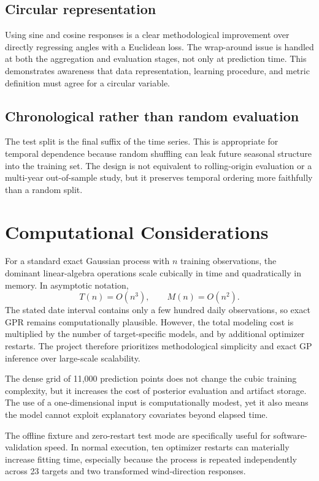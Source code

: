 \documentclass[11pt,a4paper]{article}
\begin{document}
\subsection{Circular representation}
Using sine and cosine responses is a clear methodological improvement over directly regressing angles with a Euclidean loss. The wrap-around issue is handled at both the aggregation and evaluation stages, not only at prediction time. This demonstrates awareness that data representation, learning procedure, and metric definition must agree for a circular variable.

\subsection{Chronological rather than random evaluation}
The test split is the final suffix of the time series. This is appropriate for temporal dependence because random shuffling can leak future seasonal structure into the training set. The design is not equivalent to rolling-origin evaluation or a multi-year out-of-sample study, but it preserves temporal ordering more faithfully than a random split.

\section{Computational Considerations}
For a standard exact Gaussian process with $n$ training observations, the dominant linear-algebra operations scale cubically in time and quadratically in memory. In asymptotic notation,
\begin{equation}
 T(n)=O(n^3),\qquad M(n)=O(n^2).
\end{equation}
The stated date interval contains only a few hundred daily observations, so exact GPR remains computationally plausible. However, the total modeling cost is multiplied by the number of target-specific models, and by additional optimizer restarts. The project therefore prioritizes methodological simplicity and exact GP inference over large-scale scalability.

The dense grid of 11,000 prediction points does not change the cubic training complexity, but it increases the cost of posterior evaluation and artifact storage. The use of a one-dimensional input is computationally modest, yet it also means the model cannot exploit explanatory covariates beyond elapsed time.

The offline fixture and zero-restart test mode are specifically useful for software-validation speed. In normal execution, ten optimizer restarts can materially increase fitting time, especially because the process is repeated independently across 23 targets and two transformed wind-direction responses.
\end{document}
